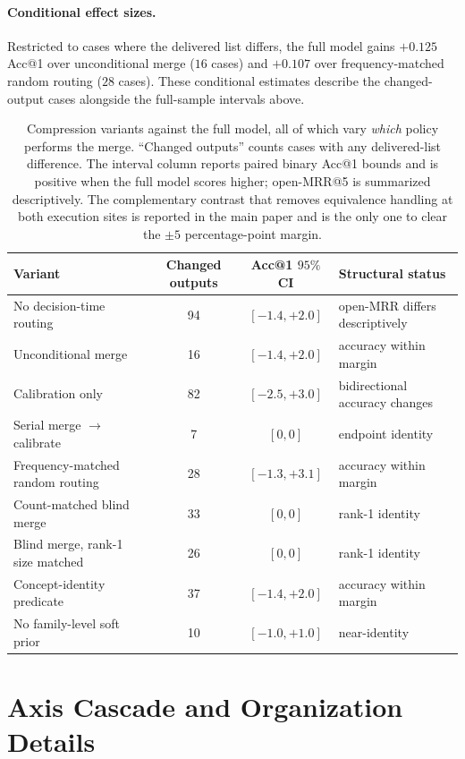 \documentclass[letterpaper]{article}
\begin{document}
\paragraph{Conditional effect sizes.}
Restricted to cases where the delivered list differs, the full model gains $+0.125$ Acc@1 over unconditional merge ($16$ cases) and $+0.107$ over frequency-matched random routing ($28$ cases).
These conditional estimates describe the changed-output cases alongside the full-sample intervals above.

\begin{table}[t]
\centering
\small
\begin{tabular}{lccl}
\toprule
Variant & Changed outputs & Acc@1 $95\%$ CI & Structural status \\
\midrule
No decision-time routing & 94 & $[-1.4,+2.0]$ & open-MRR differs descriptively \\
Unconditional merge & 16 & $[-1.4,+2.0]$ & accuracy within margin \\
Calibration only & 82 & $[-2.5,+3.0]$ & bidirectional accuracy changes \\
Serial merge $\rightarrow$ calibrate & 7 & $[0,0]$ & endpoint identity \\
Frequency-matched random routing & 28 & $[-1.3,+3.1]$ & accuracy within margin \\
Count-matched blind merge & 33 & $[0,0]$ & rank-1 identity \\
Blind merge, rank-1 size matched & 26 & $[0,0]$ & rank-1 identity \\
Concept-identity predicate & 37 & $[-1.4,+2.0]$ & accuracy within margin \\
No family-level soft prior & 10 & $[-1.0,+1.0]$ & near-identity \\
\bottomrule
\end{tabular}
\caption{Compression variants against the full model, all of which vary \emph{which} policy performs the merge. ``Changed outputs'' counts cases with any delivered-list difference. The interval column reports paired binary Acc@1 bounds and is positive when the full model scores higher; open-MRR@5 is summarized descriptively. The complementary contrast that removes equivalence handling at both execution sites is reported in the main paper and is the only one to clear the $\pm5$ percentage-point margin.}
\label{tab:eq-equiv}
\end{table}

\section{Axis Cascade and Organization Details}
\end{document}
